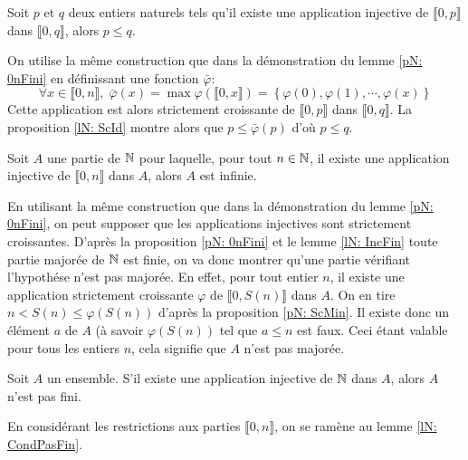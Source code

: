 \begin{lemn}\label{lN: Injpq}
 Soit $p$ et $q$ deux entiers naturels tels qu'il existe une application injective de $\llbracket 0,p \rrbracket$ dans $\llbracket 0,q \rrbracket$, alors $p\leq q$.
\end{lemn}
\begin{demo}
 On utilise la même construction que dans la démonstration du lemme \ref{pN: 0nFini} en définissant une fonction $\bar{\varphi}$:
\begin{displaymath}
 \forall x\in \llbracket 0,n \rrbracket,\; \bar{\varphi}(x) = \max \varphi(\llbracket 0,x \rrbracket) = \left\lbrace \varphi(0), \varphi(1), \cdots ,\varphi(x)\right\rbrace 
\end{displaymath}
Cette application est alors strictement croissante de $\llbracket 0,p \rrbracket$ dans $\llbracket 0,q \rrbracket$. La proposition \ref{lN: ScId} montre alors que $p \leq \bar \varphi(p)$ d'où $p\leq q$. 
\end{demo}

\begin{lemn}\label{lN: CondPasFin}
 Soit $A$ une partie de $\mathbb{N}$ pour laquelle, pour tout $n\in \mathbb{N}$, il existe une application injective de $\llbracket 0,n \rrbracket$ dans $A$, alors $A$ est infinie.
\end{lemn}
\begin{demo}
 En utilisant la même construction que dans la démonstration du lemme \ref{pN: 0nFini}, on peut supposer que les applications injectives sont strictement croissantes.\newline
D'après la proposition \ref{pN: 0nFini} et le lemme \ref{lN: IncFin} toute partie majorée de $\mathbb{N}$ est finie, on va donc montrer qu'une partie vérifiant l'hypothése n'est pas majorée.\newline
En effet, pour tout entier $n$, il existe une application strictement croissante $\varphi$ de $\llbracket 0,S(n) \rrbracket$ dans $A$. On en tire $n < S(n) \leq \varphi(S(n))$ d'après la proposition \ref{pN: ScMin}. Il existe donc un élément $a$ de $A$ (à savoir $\varphi(S(n))$ tel que $a\leq n$ est faux. Ceci étant valable pour tous les entiers $n$, cela signifie que $A$ n'est pas majorée.
\end{demo}

\begin{prop}[\ref{pN: ConPasFin}]
 Soit $A$ un ensemble. S'il existe une application injective de $\mathbb{N}$ dans $A$, alors $A$ n'est pas fini.
\end{prop}
\begin{demo}
 En considérant les restrictions aux parties $\llbracket 0,n \rrbracket$, on se ramène au lemme \ref{lN: CondPasFin}.
\end{demo}

